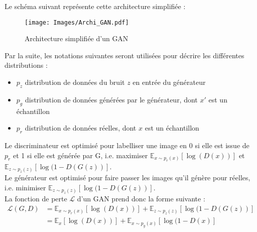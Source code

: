\documentclass{article}
\begin{document}
Le schéma suivant représente cette architecture simplifiée :
\begin{figure}[H]
    \centering
    \texttt{[image: Images/Archi\_GAN.pdf]}
    \caption{Architecture simplifiée d'un GAN}
\end{figure}

Par la suite, les notations suivantes seront utilisées pour décrire les différentes distributions :
\begin{itemize}
    \item $p_z$ distribution de données du bruit $z$ en entrée du générateur
    \item $p_g$ distribution de données générées par le générateur, dont $x'$ est un échantillon
    \item $p_r$ distribution de données réelles, dont $x$ est un échantillon
\end{itemize}
Le discriminateur est optimisé pour labelliser une image en 0 si elle est issue de $p_r$ et 1 si elle est générée par G, i.e. maximiser $\mathbb{E}_{x \sim p_r(x)}[\log(D(x))]$ et $\mathbb{E}_{z \sim p_z(z)}[\log(1 - D(G(z))]$. \\
Le générateur est optimisé pour faire passer les images qu'il génère pour réelles, i.e. minimiser $\mathbb{E}_{z \sim p_z(z)}[\log(1 - D(G(z))]$. \\
La fonction de perte $\mathcal{L}$ d'un GAN prend donc la forme suivante :
\begin{align*}
\mathcal{L}(G,D) &= \mathbb{E}_{x \sim p_r(x)}[\log(D(x))] + \mathbb{E}_{z \sim p_z(z)}[\log(1 - D(G(z))] \\
&= \mathbb{E}_{x}[\log(D(x))] + \mathbb{E}_{x \sim p_g(x)}[\log(1 - D(x)]
\end{align*}
\end{document}
